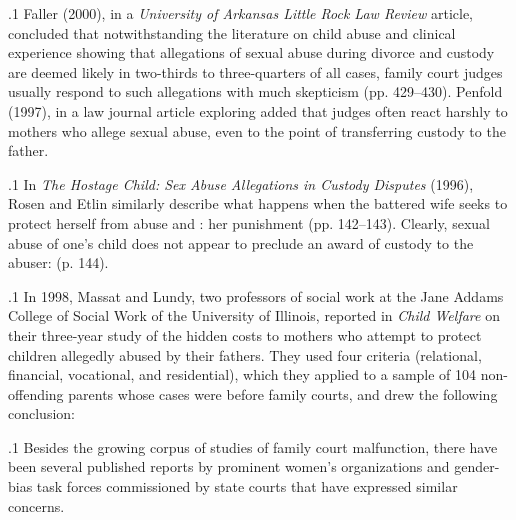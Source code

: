 \documentclass[11pt, twoside]{article}
\begin{document}
{\p.1{%
Faller (2000), in a \textit{University of Arkansas Little Rock Law Review} article, concluded that notwithstanding the literature on child abuse and
clinical experience showing that allegations of sexual abuse during divorce and custody are deemed likely in two-thirds to three-quarters
of all cases, family court judges usually respond to such allegations
with much skepticism (pp. 429–430). Penfold (1997), in a law journal article exploring  added that judges often react harshly to mothers who allege sexual abuse, even to the point of transferring custody to the
father.
}%

\p.1{%
In \textit{The Hostage Child: Sex Abuse Allegations in Custody Disputes}
(1996), Rosen and Etlin similarly describe what happens when the battered wife seeks to protect herself from abuse and : her punishment  (pp. 142–143). Clearly, sexual abuse of one’s child does not
appear to preclude an award of custody to the abuser:  (p. 144).
}%

\p.1{%
In 1998, Massat and Lundy, two professors of social work at the Jane
Addams College of Social Work of the University of Illinois, reported
in \textit{Child Welfare} on their three-year study of the hidden costs to mothers who attempt to protect children allegedly abused by their fathers.
They used four criteria (relational, financial, vocational, and residential), which they applied to a sample of 104 non-offending parents whose
cases were before family courts, and drew the following conclusion:
}%

\p.1{%
Besides the growing corpus of studies of family court malfunction,
there have been several published reports by prominent women’s organizations and gender-bias task forces commissioned by state courts that
have expressed similar concerns.
}%

}
\end{document}

